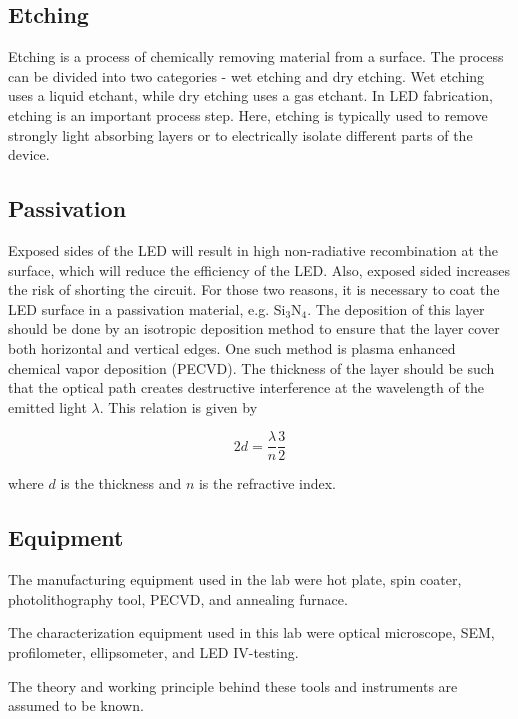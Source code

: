 \subsection{Etching}
\label{etching}

Etching is a process of chemically removing material from a surface. 
The process can be divided into two categories -  wet etching and dry etching.
Wet etching uses a liquid etchant, while dry etching uses a gas etchant.
In LED fabrication, etching is an important process step.
Here, etching is typically used to remove strongly light absorbing layers or to electrically isolate different parts of the device.

\subsection{Passivation} \label{passivation}

Exposed sides of the LED will result in high non-radiative recombination at the surface, which will reduce the efficiency of the LED.
Also, exposed sided increases the risk of shorting the circuit.
For those two reasons, it is necessary to coat the LED surface in a passivation material, e.g. Si$_3$N$_4$.
The deposition of this layer should be done by an isotropic deposition method to ensure that the layer cover both horizontal and vertical edges.
One such method is plasma enhanced chemical vapor deposition (PECVD).
The thickness of the layer should be such that the optical path creates destructive interference at the wavelength of the emitted light $\lambda$.
This relation is given by

\begin{equation}
    \label{eq:thickness}
    2d = \frac{\lambda}{n} \frac{3}{2}
\end{equation}

where $d$ is the thickness and $n$ is the refractive index.

\subsection{Equipment}
\label{Equipment}

The manufacturing equipment used in the lab were hot plate, spin coater, photolithography tool, PECVD, and annealing furnace.

The characterization equipment used in this lab were optical microscope, SEM, profilometer, ellipsometer, and LED IV-testing.

The theory and working principle behind these tools and instruments are assumed to be known.